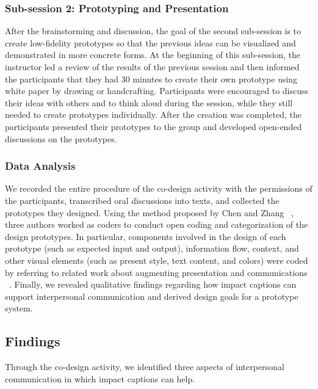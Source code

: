\subsubsection{Sub-session 2: Prototyping and Presentation}
After the brainstorming and discussion, the goal of the second sub-session is to create low-fidelity prototypes so that the previous ideas can be visualized and demonstrated in more concrete forms.
At the beginning of this sub-session, the instructor led a review of the results of the previous session and then informed the participants that they had 30 minutes to create their own prototype using white paper by drawing or handcrafting. Participants were encouraged to discuss their ideas with others and to think aloud during the session, while they still needed to create prototypes individually. After the creation was completed, the participants presented their prototypes to the group and developed open-ended discussions on the prototypes.



\subsubsection{Data Analysis} 
We recorded the entire procedure of the co-design activity with the permissions of the participants, transcribed oral discussions into texts, and collected the prototypes they designed. 
Using the method proposed by Chen and Zhang ~\cite{chen2015remote}, three authors worked as coders to conduct open coding and categorization of the design prototypes. 
In particular, components involved in the design of each prototype (such as expected input and output), information flow, context, and other visual elements (such as present style, text content, and colors) were coded by referring to related work about augmenting presentation and communications ~\cite{liu2023visual, liao2022realitytalk, de2024caption}.
Finally, we revealed qualitative findings regarding how impact captions can support interpersonal communication and derived design goals for a prototype system. 

\subsection{Findings}
Through the co-design activity, we identified three aspects of interpersonal communication in which impact captions can help.

